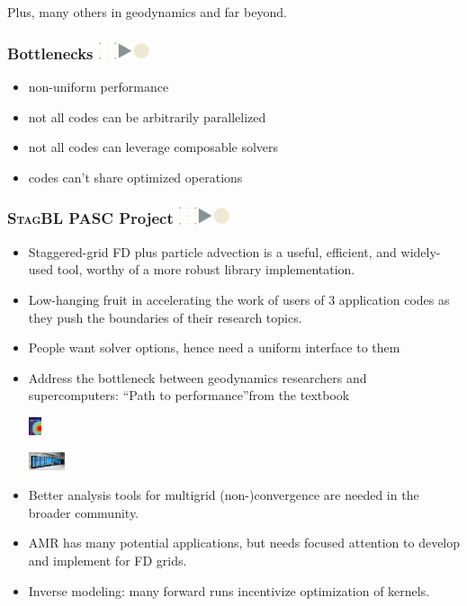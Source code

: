 \documentclass{beamer}
\newcommand\frametitlelogo[1]{\frametitle{#1\hspace{0pt plus 1 filll} \includegraphics[width=42pt]{logo_slides}}}
\newcommand{\StagBL}{\textsc{StagBL}}
\begin{document}
\begin{frame}[fragile]
\begin{minipage}{0.49\textwidth}
Plus, many others in geodynamics and far beyond.
\end{minipage}
\end{frame}

\begin{frame}[fragile]
\frametitlelogo{Bottlenecks}
\begin{itemize}
\item non-uniform performance
\item not all codes can be arbitrarily parallelized
\item not all codes can leverage composable solvers
\item codes can't share optimized operations
\end{itemize}
\end{frame}

\begin{frame}[fragile]
  \frametitlelogo{\StagBL{} PASC Project}
\begin{itemize}
\item Staggered-grid FD plus particle advection is a useful, efficient, and widely-used tool, worthy of a more robust library implementation.
\item Low-hanging fruit in accelerating the work of users of 3 application codes as they push the boundaries of their research topics.
\item People want solver options, hence need a uniform interface to them
\item Address the bottleneck between geodynamics researchers and supercomputers: ``Path to performance''from the textbook
  \begin{center}
  \includegraphics[height=20px]{geryabook} \begin{minipage}{20px}\scalebox{1}{$\rightarrow$}\vspace{10px}\end{minipage}\includegraphics[height=20px]{daint}
  \end{center}
\item Better analysis tools for multigrid (non-)convergence are needed in the broader community.
\item AMR has many potential applications, but needs focused attention to develop and implement for FD grids.
\item Inverse modeling: many forward runs incentivize optimization of kernels.
\end{itemize}
\end{frame}
\end{document}
